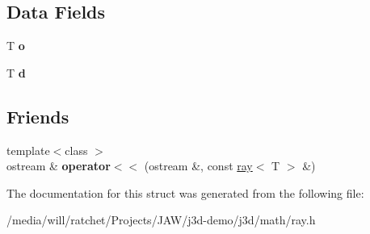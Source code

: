 \subsection*{Data Fields}
\begin{DoxyCompactItemize}
\item 
\hypertarget{structj3d_1_1ray_a37e81619c53928fb39a795c3c2cb7429}{}T {\bfseries o}\label{structj3d_1_1ray_a37e81619c53928fb39a795c3c2cb7429}

\item 
\hypertarget{structj3d_1_1ray_ad61a092f6d24ee93754a9d0737f54c2f}{}T {\bfseries d}\label{structj3d_1_1ray_ad61a092f6d24ee93754a9d0737f54c2f}

\end{DoxyCompactItemize}
\subsection*{Friends}
\begin{DoxyCompactItemize}
\item 
\hypertarget{structj3d_1_1ray_ab3d1ca1bda6bf1df96a457983abf2e50}{}{\footnotesize template$<$class $>$ }\\ostream \& {\bfseries operator$<$$<$} (ostream \&, const \hyperlink{structj3d_1_1ray}{ray}$<$ T $>$ \&)\label{structj3d_1_1ray_ab3d1ca1bda6bf1df96a457983abf2e50}

\end{DoxyCompactItemize}


The documentation for this struct was generated from the following file\+:\begin{DoxyCompactItemize}
\item 
/media/will/ratchet/\+Projects/\+J\+A\+W/j3d-\/demo/j3d/math/ray.\+h\end{DoxyCompactItemize}
